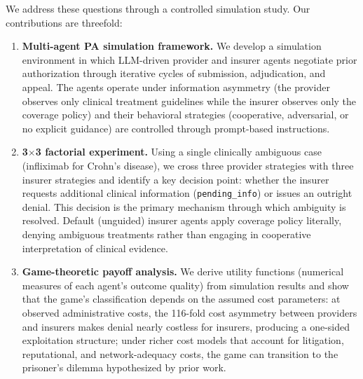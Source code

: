 We address these questions through a controlled simulation study. Our contributions are threefold:
\begin{enumerate}
    \item \textbf{Multi-agent PA simulation framework.}
    We develop a simulation environment in which LLM-driven provider and insurer agents negotiate prior authorization through iterative cycles of submission, adjudication, and appeal. The agents operate under information asymmetry (the provider observes only clinical treatment guidelines while the insurer observes only the coverage policy) and their behavioral strategies (cooperative, adversarial, or no explicit guidance) are controlled through prompt-based instructions.
    \item \textbf{3$\times$3 factorial experiment.}
    Using a single clinically ambiguous case (infliximab for Crohn's disease), we cross three provider strategies with three insurer strategies and identify a key decision point: whether the insurer requests additional clinical information (\texttt{pending\_info}) or issues an outright denial. This decision is the primary mechanism through which ambiguity is resolved. Default (unguided) insurer agents apply coverage policy literally, denying ambiguous treatments rather than engaging in cooperative interpretation of clinical evidence.
    \item \textbf{Game-theoretic payoff analysis.}
    We derive utility functions (numerical measures of each agent's outcome quality) from simulation results and show that the game's classification depends on the assumed cost parameters: at observed administrative costs, the 116-fold cost asymmetry between providers and insurers makes denial nearly costless for insurers, producing a one-sided exploitation structure; under richer cost models that account for litigation, reputational, and network-adequacy costs, the game can transition to the prisoner's dilemma hypothesized by prior work.
\end{enumerate}
